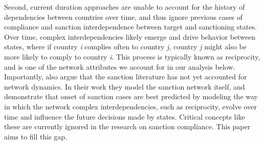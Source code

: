 Second, current duration approaches are unable to account for the history of dependencies between countries over time, and thus ignore previous cases of compliance and sanction interdependence between target and sanctioning states.  Over time, complex interdependencies likely emerge and drive behavior between states, where if country \textit{i} complies often to country \textit{j}, country \textit{j} might also be more likely to comply to country \textit{i}. This process is typically known as reciprocity, and is one of the network attributes we account for in our analysis below. Importantly, \citet{cranmer2014reciprocity} also argue that the sanction literature has not yet accounted for network dynamics. In their work they model the sanction network itself, and demonstrate that onset of sanction cases are best predicted by modeling the way in which the network complex interdependencies, such as reciprocity, evolve over time and influence the future decisions made by states. Critical concepts like these are currently ignored in the research on sanction compliance. This paper aims to fill this gap. 



